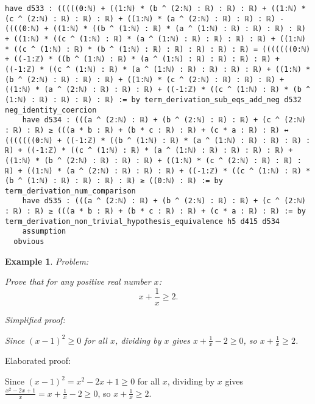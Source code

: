 \documentclass{article}
\newtheorem{example}{Example}
\begin{document}
\begin{tcolorbox}[colback=white!10, width=\linewidth]
\begin{lstlisting}[language=Lean4]
    have d533 : (((((0:ℕ) + ((1:ℕ) * (b ^ (2:ℕ) : ℝ) : ℝ) : ℝ) + ((1:ℕ) * (c ^ (2:ℕ) : ℝ) : ℝ) : ℝ) + ((1:ℕ) * (a ^ (2:ℕ) : ℝ) : ℝ) : ℝ) - ((((0:ℕ) + ((1:ℕ) * ((b ^ (1:ℕ) : ℝ) * (a ^ (1:ℕ) : ℝ) : ℝ) : ℝ) : ℝ) + ((1:ℕ) * ((c ^ (1:ℕ) : ℝ) * (a ^ (1:ℕ) : ℝ) : ℝ) : ℝ) : ℝ) + ((1:ℕ) * ((c ^ (1:ℕ) : ℝ) * (b ^ (1:ℕ) : ℝ) : ℝ) : ℝ) : ℝ) : ℝ) = (((((((0:ℕ) + ((-1:ℤ) * ((b ^ (1:ℕ) : ℝ) * (a ^ (1:ℕ) : ℝ) : ℝ) : ℝ) : ℝ) + ((-1:ℤ) * ((c ^ (1:ℕ) : ℝ) * (a ^ (1:ℕ) : ℝ) : ℝ) : ℝ) : ℝ) + ((1:ℕ) * (b ^ (2:ℕ) : ℝ) : ℝ) : ℝ) + ((1:ℕ) * (c ^ (2:ℕ) : ℝ) : ℝ) : ℝ) + ((1:ℕ) * (a ^ (2:ℕ) : ℝ) : ℝ) : ℝ) + ((-1:ℤ) * ((c ^ (1:ℕ) : ℝ) * (b ^ (1:ℕ) : ℝ) : ℝ) : ℝ) : ℝ) := by term_derivation_sub_eqs_add_neg d532 neg_identity_coercion
    have d534 : (((a ^ (2:ℕ) : ℝ) + (b ^ (2:ℕ) : ℝ) : ℝ) + (c ^ (2:ℕ) : ℝ) : ℝ) ≥ (((a * b : ℝ) + (b * c : ℝ) : ℝ) + (c * a : ℝ) : ℝ) ↔ (((((((0:ℕ) + ((-1:ℤ) * ((b ^ (1:ℕ) : ℝ) * (a ^ (1:ℕ) : ℝ) : ℝ) : ℝ) : ℝ) + ((-1:ℤ) * ((c ^ (1:ℕ) : ℝ) * (a ^ (1:ℕ) : ℝ) : ℝ) : ℝ) : ℝ) + ((1:ℕ) * (b ^ (2:ℕ) : ℝ) : ℝ) : ℝ) + ((1:ℕ) * (c ^ (2:ℕ) : ℝ) : ℝ) : ℝ) + ((1:ℕ) * (a ^ (2:ℕ) : ℝ) : ℝ) : ℝ) + ((-1:ℤ) * ((c ^ (1:ℕ) : ℝ) * (b ^ (1:ℕ) : ℝ) : ℝ) : ℝ) : ℝ) ≥ ((0:ℕ) : ℝ) := by term_derivation_num_comparison
    have d535 : (((a ^ (2:ℕ) : ℝ) + (b ^ (2:ℕ) : ℝ) : ℝ) + (c ^ (2:ℕ) : ℝ) : ℝ) ≥ (((a * b : ℝ) + (b * c : ℝ) : ℝ) + (c * a : ℝ) : ℝ) := by term_derivation_non_trivial_hypothesis_equivalence h5 d415 d534
    assumption
  obvious

\end{lstlisting}
\end{tcolorbox}


\begin{example}
Problem:
\begin{tcolorbox}[colback=yellow!10, width=\linewidth]
Prove that for any positive real number $x$:
    $$x + \frac{1}{x} \geq 2.$$
\end{tcolorbox}

Simplified proof:
\begin{tcolorbox}[colback=blue!10, width=\linewidth]
Since $(x-1)^2 \ge 0$ for all $x$, dividing by $x$ gives $x + \frac{1}{x} - 2 \ge 0$, so $x + \frac{1}{x} \ge 2$.
\end{tcolorbox}
\end{example}

Elaborated proof:
\begin{tcolorbox}[colback=green!10, width=\linewidth]
Since $(x-1)^2 = x^2 - 2x + 1 \ge 0$ for all $x$, dividing by $x$ gives $\frac{x^2 - 2x + 1}{x} = x + \frac{1}{x} - 2 \ge 0$, so $x + \frac{1}{x} \ge 2$.
\end{tcolorbox}
\end{document}
